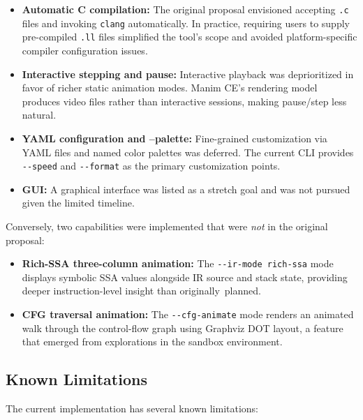 \begin{itemize}
    \item \textbf{Automatic C compilation:} The original proposal envisioned accepting \texttt{.c} files and invoking \texttt{clang} automatically. In practice, requiring users to supply pre-compiled \texttt{.ll} files simplified the tool's scope and avoided platform-specific compiler configuration issues.

    \item \textbf{Interactive stepping and pause:} Interactive playback was deprioritized in favor of richer static animation modes. Manim CE's rendering model produces video files rather than interactive sessions, making pause/step less natural.

    \item \textbf{YAML configuration and --palette:} Fine-grained customization via YAML files and named color palettes was deferred. The current CLI provides \texttt{-{}-speed} and \texttt{-{}-format} as the primary customization points.

    \item \textbf{GUI:} A graphical interface was listed as a stretch goal and was not pursued given the limited timeline.
\end{itemize}

Conversely, two capabilities were implemented that were \textit{not} in the original proposal:
\begin{itemize}
    \item \textbf{Rich-SSA three-column animation:} The \texttt{-{}-ir-mode rich-ssa} mode displays symbolic SSA values alongside IR source and stack state, providing deeper instruction-level insight than originally~planned.
    \item \textbf{CFG traversal animation:} The \texttt{-{}-cfg-animate} mode renders an animated walk through the control-flow graph using Graphviz DOT layout, a feature that emerged from explorations in the sandbox environment.
\end{itemize}

\subsection{Known Limitations}
The current implementation has several known limitations:

